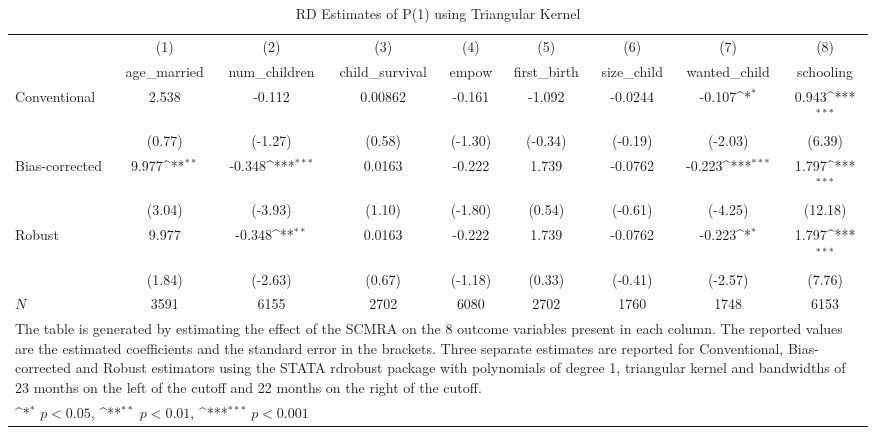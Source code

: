 \begin{table}[htbp]\centering
\def\sym#1{\ifmmode^{#1}\else\(^{#1}\)\fi}
\caption{RD Estimates of P(1) using Triangular Kernel}
\begin{tabular}{l*{8}{c}}
\toprule
            &\multicolumn{1}{c}{(1)}&\multicolumn{1}{c}{(2)}&\multicolumn{1}{c}{(3)}&\multicolumn{1}{c}{(4)}&\multicolumn{1}{c}{(5)}&\multicolumn{1}{c}{(6)}&\multicolumn{1}{c}{(7)}&\multicolumn{1}{c}{(8)}\\
            &\multicolumn{1}{c}{age\_married}&\multicolumn{1}{c}{num\_children}&\multicolumn{1}{c}{child\_survival}&\multicolumn{1}{c}{empow}&\multicolumn{1}{c}{first\_birth}&\multicolumn{1}{c}{size\_child}&\multicolumn{1}{c}{wanted\_child}&\multicolumn{1}{c}{schooling}\\
\midrule
Conventional&       2.538         &      -0.112         &     0.00862         &      -0.161         &      -1.092         &     -0.0244         &      -0.107\sym{*}  &       0.943\sym{***}\\
            &      (0.77)         &     (-1.27)         &      (0.58)         &     (-1.30)         &     (-0.34)         &     (-0.19)         &     (-2.03)         &      (6.39)         \\
\addlinespace
Bias-corrected&       9.977\sym{**} &      -0.348\sym{***}&      0.0163         &      -0.222         &       1.739         &     -0.0762         &      -0.223\sym{***}&       1.797\sym{***}\\
            &      (3.04)         &     (-3.93)         &      (1.10)         &     (-1.80)         &      (0.54)         &     (-0.61)         &     (-4.25)         &     (12.18)         \\
\addlinespace
Robust      &       9.977         &      -0.348\sym{**} &      0.0163         &      -0.222         &       1.739         &     -0.0762         &      -0.223\sym{*}  &       1.797\sym{***}\\
            &      (1.84)         &     (-2.63)         &      (0.67)         &     (-1.18)         &      (0.33)         &     (-0.41)         &     (-2.57)         &      (7.76)         \\
\midrule
\(N\)       &        3591         &        6155         &        2702         &        6080         &        2702         &        1760         &        1748         &        6153         \\
\bottomrule
\multicolumn{9}{l}{\footnotesize The table is generated by estimating the effect of the SCMRA on the 8 outcome variables present in each column. The reported values are the estimated coefficients and the standard error in the brackets. Three separate estimates are reported for Conventional, Bias-corrected and Robust estimators using the STATA rdrobust package with polynomials of degree 1, triangular kernel and bandwidths of 23 months on the left of the cutoff and 22 months on the right of the cutoff.}\\
\multicolumn{9}{l}{\footnotesize \sym{*} \(p<0.05\), \sym{**} \(p<0.01\), \sym{***} \(p<0.001\)}\\
\end{tabular}
\end{table}

